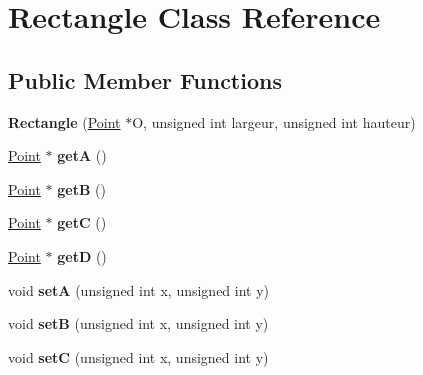 \hypertarget{class_rectangle}{}\section{Rectangle Class Reference}
\label{class_rectangle}
\subsection*{Public Member Functions}
\begin{DoxyCompactItemize}
\item 
\mbox{\label{class_rectangle_ae39b8e25a9018e7584dd42baddad7f16}} 
{\bfseries Rectangle} (\hyperlink{class_point}{Point} $\ast$O, unsigned int largeur, unsigned int hauteur)
\item 
\mbox{\label{class_rectangle_a3538b56a8227cbbcaa00c329af7ef9e2}} 
\hyperlink{class_point}{Point} $\ast$ {\bfseries getA} ()
\item 
\mbox{\label{class_rectangle_a9bc53e7e2822642f757c2cb096e6cef9}} 
\hyperlink{class_point}{Point} $\ast$ {\bfseries getB} ()
\item 
\mbox{\label{class_rectangle_a942eca0e7012f425ea5d725e5efc501e}} 
\hyperlink{class_point}{Point} $\ast$ {\bfseries getC} ()
\item 
\mbox{\label{class_rectangle_a29db8e0a388d3e72689f2f1c7aa74b2d}} 
\hyperlink{class_point}{Point} $\ast$ {\bfseries getD} ()
\item 
\mbox{\label{class_rectangle_a7d83d13d6eee126086384d74e934f407}} 
void {\bfseries setA} (unsigned int x, unsigned int y)
\item 
\mbox{\label{class_rectangle_a860b01311df612bef4afd6c979f35532}} 
void {\bfseries setB} (unsigned int x, unsigned int y)
\item 
\mbox{\label{class_rectangle_a5d43eb09009865013fee0fbe8a6c11b8}} 
void {\bfseries setC} (unsigned int x, unsigned int y)
\item 
\mbox{\label{class_rectangle_afab6678795c2702e829fc19b34821fb1}} 

\end{DoxyCompactItemize}
